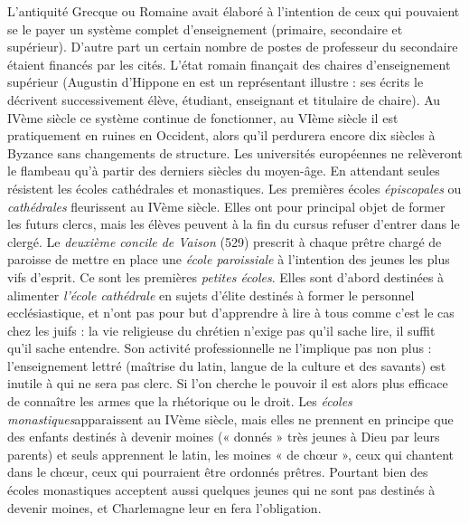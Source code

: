  L'antiquité Grecque ou Romaine avait élaboré à l'intention de ceux qui pouvaient se le payer un système complet d'enseignement (primaire, secondaire et supérieur). D'autre part un certain nombre de postes de professeur du secondaire étaient financés par les cités. L'état romain finançait des chaires d'enseignement supérieur (Augustin d'Hippone en est un représentant illustre : ses écrits le décrivent successivement élève, étudiant, enseignant et titulaire de chaire). Au IVème siècle ce système continue de fonctionner, au VIème siècle il est pratiquement en ruines en Occident, alors qu'il perdurera encore dix siècles à Byzance sans changements de structure. Les universités européennes ne relèveront le flambeau qu'à partir des derniers siècles du moyen-âge. 
 En attendant seules résistent les écoles cathédrales et monastiques. Les premières écoles \emph{épiscopales} ou \emph{cathédrales} fleurissent au IVème siècle. Elles ont pour principal objet de former les futurs clercs, mais les élèves peuvent à la fin du cursus refuser d'entrer dans le clergé. Le \emph{deuxième} \emph{concile de Vaison} (529) prescrit à chaque prêtre chargé de paroisse de mettre en place une \emph{école paroissiale} à l'intention des jeunes les plus vifs d'esprit. Ce sont les premières \emph{petites écoles}. Elles sont d'abord destinées à alimenter \emph{l'école cathédrale} en sujets d'élite destinés à former le personnel ecclésiastique, et n'ont pas pour but d'apprendre à lire à tous comme c'est le cas chez les juifs : la vie religieuse du chrétien n'exige pas qu'il sache lire, il suffit qu'il sache entendre. Son activité professionnelle ne l'implique pas non plus : l'enseignement lettré (maîtrise du latin, langue de la culture et des savants) est inutile à qui ne sera pas clerc. Si l'on cherche le pouvoir il est alors plus efficace de connaître les armes que la rhétorique ou le droit. Les \emph{écoles monastiques}apparaissent au IVème siècle, mais elles ne prennent en principe que des enfants destinés à devenir moines (« donnés » très jeunes à Dieu par leurs parents) et seuls apprennent le latin, les moines « de chœur », ceux qui chantent dans le chœur, ceux qui pourraient être ordonnés prêtres. Pourtant bien des écoles monastiques acceptent aussi quelques jeunes qui ne sont pas destinés à devenir moines, et Charlemagne leur en fera l'obligation.
 
